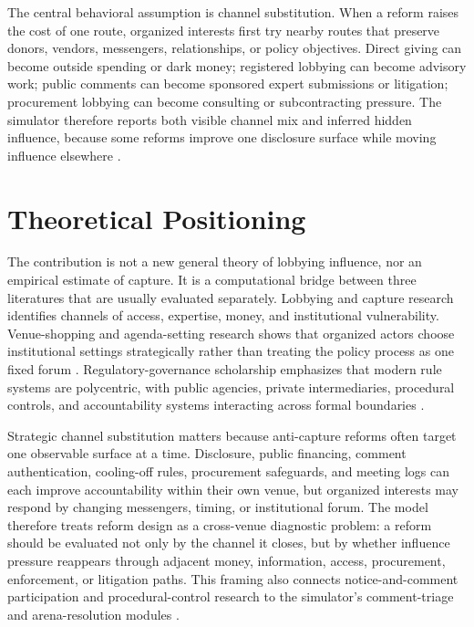 The central behavioral assumption is channel substitution. When a reform raises the cost of one route, organized interests first try nearby routes that preserve donors, vendors, messengers, relationships, or policy objectives. Direct giving can become outside spending or dark money; registered lobbying can become advisory work; public comments can become sponsored expert submissions or litigation; procurement lobbying can become consulting or subcontracting pressure. The simulator therefore reports both visible channel mix and inferred hidden influence, because some reforms improve one disclosure surface while moving influence elsewhere \citep{dalbo2006capture,carpenterMoss2014,lapiraThomas2017,oecdLobbying2021,brennanDarkMoney2025}.

\section{Theoretical Positioning}

The contribution is not a new general theory of lobbying influence, nor an empirical estimate of capture. It is a computational bridge between three literatures that are usually evaluated separately. Lobbying and capture research identifies channels of access, expertise, money, and institutional vulnerability. Venue-shopping and agenda-setting research shows that organized actors choose institutional settings strategically rather than treating the policy process as one fixed forum \citep{baumgartnerJones1993,pralle2003venue}. Regulatory-governance scholarship emphasizes that modern rule systems are polycentric, with public agencies, private intermediaries, procedural controls, and accountability systems interacting across formal boundaries \citep{black2008polycentric,leviFaur2011regulation}.

Strategic channel substitution matters because anti-capture reforms often target one observable surface at a time. Disclosure, public financing, comment authentication, cooling-off rules, procurement safeguards, and meeting logs can each improve accountability within their own venue, but organized interests may respond by changing messengers, timing, or institutional forum. The model therefore treats reform design as a cross-venue diagnostic problem: a reform should be evaluated not only by the channel it closes, but by whether influence pressure reappears through adjacent money, information, access, procurement, enforcement, or litigation paths. This framing also connects notice-and-comment participation and procedural-control research to the simulator's comment-triage and arena-resolution modules \citep{balla1998administrative,naughton2009commenter}.

